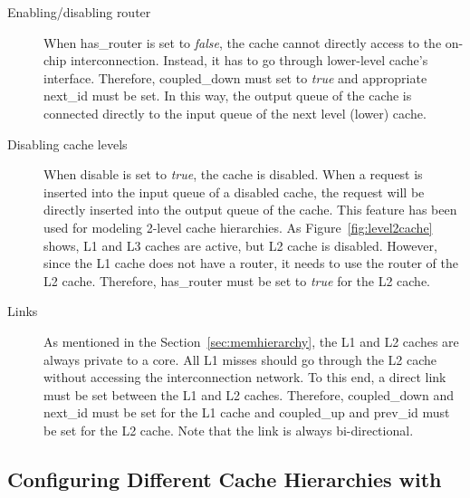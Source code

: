 \begin{description}
  \item[Enabling/disabling router] When \textsf{has\_router} is set to \textit{false},
  the cache cannot directly access to the on-chip
  interconnection. Instead, it has to go through lower-level cache's
  interface. Therefore, \textsf{coupled\_down} must set
  to \textit{true} and appropriate \textsf{next\_id} must be set. In
  this way, the output queue of the cache is connected directly to the
  input queue of the next level (lower) cache.

  \item[Disabling cache levels] When \textsf{disable} is set to \textit{true},
  the cache is disabled. When a request is inserted into the input queue of a
  disabled cache, the request will be directly inserted into the output queue
  of the cache. This feature has been used for modeling 2-level cache
  hierarchies. As Figure~\ref{fig:level2cache} shows, L1 and L3 caches are
  active, but L2 cache is disabled. However, since the L1 cache does not have a
  router, it needs to use the router of the L2 cache. Therefore,
  \textsf{has\_router} must be set to \textit{true} for the L2 cache.

  \item[Links] As mentioned in the Section~\ref{sec:memhierarchy}, the
  L1 and L2 caches are always private to a core. All L1 misses
  should go through the L2 cache without accessing the interconnection
  network. To this end, a direct link must be set between the L1 and
  L2 caches. Therefore, \textsf{coupled\_down} and \textsf{next\_id}
  must be set for the L1 cache and \textsf{coupled\_up}
  and \textsf{prev\_id} must be set for the L2 cache. Note that the
  link is always bi-directional.

\end{description}

\subsection{Configuring Different Cache Hierarchies with \SIM}


